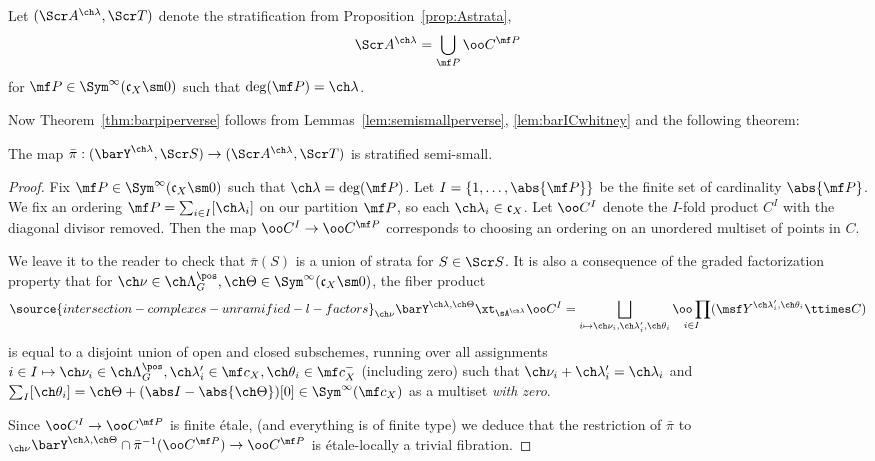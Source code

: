 Let $(\Scr A^{\ch\lambda}, \Scr T)$ denote the stratification
from Proposition~\ref{prop:Astrata},
\[ \Scr A^{\ch\lambda} = \bigcup_{\mf P} \oo C^{\mf P} \]
for $\mf P\in \Sym^\infty(\mathfrak c_X\sm 0)$ such that
$\deg(\mf P)=\ch\lambda$.





Now Theorem~\ref{thm:barpiperverse} follows
from Lemmas~\ref{lem:semismallperverse}, \ref{lem:barICwhitney}
and the following theorem:

\begin{thm}
\notready \label{thm:semismall}
The map $\bar\pi : (\barY^{\ch\lambda}, \Scr S) \to (\Scr A^{\ch\lambda}, \Scr T)$ is stratified semi-small.
\end{thm}
\begin{proof}
Fix $\mf P \in \Sym^\infty(\mathfrak c_X\sm 0)$ such that
$\ch\lambda=\deg(\mf P)$.
Let
$I = \{ 1,\dotsc, \abs{\mf P}\}$ be the finite set of cardinality
$\abs{\mf P}$. We fix an ordering
$\mf P = \sum_{i\in I} [\ch\lambda_i]$ on our partition $\mf P$,
so each $\ch\lambda_i \in \mathfrak c_X$.
Let $\oo C^I$ denote the $I$-fold product $C^I$ with the diagonal
divisor removed. Then the map $\oo C^I \to \oo C^{\mf P}$
corresponds to
choosing an ordering on an unordered multiset of points in $C$.

We leave it to the reader to check that $\bar\pi(S)$ is a union of
strata for $S \in \Scr S$.
It is also a consequence of the graded factorization property
that for
$\ch\nu\in \ch\Lambda^\pos_G, \ch\Theta \in \Sym^\infty(\mathfrak c_X \sm 0)$,
the fiber product
\begin{equation} \label{e:preimagefactorize}
\source{intersection-complexes-unramified-l-factors}
    _{\ch\nu}\barY^{\ch\lambda,\ch\Theta}
    \xt_{\sA^{\ch\lambda}} \oo C^I
    =   \bigsqcup_{i \mapsto \ch\nu_i,\ch\lambda'_i, \ch\theta_i}
    \underset{i\in I}{\oo\prod} (\msf Y^{\ch\lambda'_i, \ch\theta_i} \ttimes C )
\end{equation}
is equal to a disjoint union of open and closed subschemes,
running over all assignments $i\in I \mapsto \ch\nu_i \in \ch\Lambda^\pos_G,
\ch\lambda'_i \in \mf c_X, \ch\theta_i \in \mf c_X^-$ (including zero)
such that $\ch\nu_i + \ch\lambda'_i = \ch\lambda_i$
and $\sum_I [\ch\theta_i] = \ch\Theta + (\abs I - \abs{\ch\Theta})[0] \in
\Sym^\infty(\mf c_X)$ as a multiset \emph{with zero}.


Since $\oo C^I \to \oo C^{\mf P}$ is finite \'etale,
(and everything is of finite type) we deduce that the restriction of $\bar\pi$ to
$_{\ch\nu}\barY^{\ch\lambda,\ch\Theta} \cap \bar\pi^{-1}( \oo C^{\mf P} )
    \to \oo C^{\mf P}$
is \'etale-locally a trivial fibration.


\end{proof}
